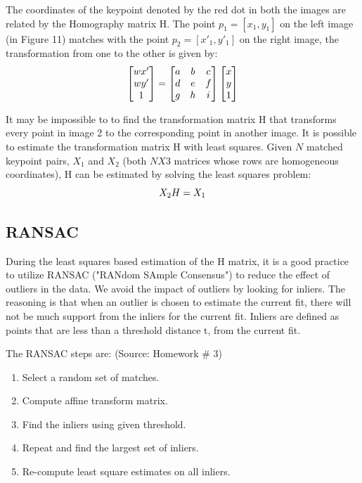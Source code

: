 \documentclass{article}
\begin{document}
The coordinates of the keypoint denoted by the red dot in both the images are related by the Homography matrix H. The point $ p_1 =  [ x_1, y_1] $ on the left image (in Figure 11) matches with the point $ p_2 =  [ x'_1, y'_1] $ on the right image, the transformation from one to the other is given by:
\begin{equation*}
\centering
\begin{bmatrix}
wx'\\ 
wy'\\ 
1
\end{bmatrix} =
\begin{bmatrix}
a &b  &c \\ 
d & e &f \\ 
g & h & i
\end{bmatrix}\begin{bmatrix}
x\\ 
y\\ 
1
\end{bmatrix}
\end{equation*}

It may be impossible to to find the transformation matrix H that transforms every point in image 2 to the corresponding point in another image. It is possible to estimate the transformation matrix H with least squares. Given $N$ matched keypoint pairs, $X_1$ and $X_2$ (both $ N X 3 $ matrices whose rows are homogeneous coordinates), H can be estimated by solving the least squares problem:
\begin{equation*}
    \centering
    X_2 H = X_1
\end{equation*}

\subsection{RANSAC}
During the least squares based estimation of the H matrix, it is a good practice to utilize RANSAC ("RANdom SAmple Consensus") to reduce the effect of outliers in the data.
We avoid the impact of outliers by looking for inliers. The reasoning is that when an outlier is chosen to estimate the current fit, there will not be much support from the inliers for the current fit. Inliers are defined as points that are less than a threshold distance t, from the current fit.

The RANSAC steps are: (Source: Homework \# 3)
\begin{enumerate}
    \item Select a random set of matches.
    \item Compute affine transform matrix.
    \item Find the inliers using given threshold.
    \item Repeat and find the largest set of inliers.
    \item Re-compute least square estimates on all inliers.
\end{enumerate}
\end{document}
